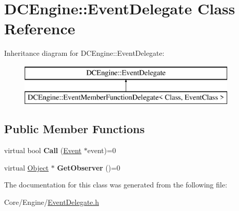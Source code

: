 \hypertarget{classDCEngine_1_1EventDelegate}{\section{D\-C\-Engine\-:\-:Event\-Delegate Class Reference}
\label{classDCEngine_1_1EventDelegate}
}
Inheritance diagram for D\-C\-Engine\-:\-:Event\-Delegate\-:\begin{figure}[H]
\begin{center}
\leavevmode
\includegraphics[height=2.000000cm]{classDCEngine_1_1EventDelegate}
\end{center}
\end{figure}
\subsection*{Public Member Functions}
\begin{DoxyCompactItemize}
\item 
\hypertarget{classDCEngine_1_1EventDelegate_a631b8c66c6a6b331236a08988ddaf148}{virtual bool {\bfseries Call} (\hyperlink{classDCEngine_1_1Event}{Event} $\ast$event)=0}\label{classDCEngine_1_1EventDelegate_a631b8c66c6a6b331236a08988ddaf148}

\item 
\hypertarget{classDCEngine_1_1EventDelegate_ad96609f548a22ccacda9b3cb966bfbbe}{virtual \hyperlink{classDCEngine_1_1Object}{Object} $\ast$ {\bfseries Get\-Observer} ()=0}\label{classDCEngine_1_1EventDelegate_ad96609f548a22ccacda9b3cb966bfbbe}

\end{DoxyCompactItemize}


The documentation for this class was generated from the following file\-:\begin{DoxyCompactItemize}
\item 
Core/\-Engine/\hyperlink{EventDelegate_8h}{Event\-Delegate.\-h}\end{DoxyCompactItemize}
